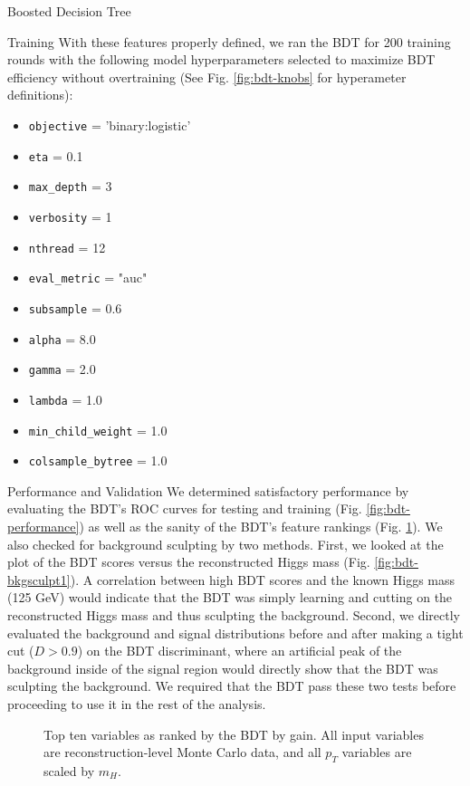 \begin{section}{Boosted Decision Tree}
\begin{subsection}{Training}
With these features properly defined, we ran the BDT for 200 training rounds with the following model hyperparameters selected to maximize BDT efficiency without overtraining (See Fig. \ref{fig:bdt-knobs} for hyperameter definitions):
\begin{itemize}
    \item \verb|objective| = 'binary:logistic'
    \item \verb|eta| = 0.1
    \item \verb|max_depth| = 3
    \item \verb|verbosity| = 1
    \item \verb|nthread| = 12
    \item \verb|eval_metric| = "auc"
    \item \verb|subsample| = 0.6
    \item \verb|alpha| = 8.0
    \item \verb|gamma| = 2.0
    \item \verb|lambda| = 1.0
    \item \verb|min_child_weight| = 1.0
    \item \verb|colsample_bytree| = 1.0
\end{itemize}

\end{subsection}
\begin{subsection}{Performance and Validation}
We determined satisfactory performance by evaluating the BDT's ROC curves for testing and training (Fig. \ref{fig:bdt-performance}) as well as the sanity of the BDT's feature rankings (Fig. \ref{fig:bdt-vars}). We also checked for background sculpting by two methods. First, we looked at the plot of the BDT scores versus the reconstructed Higgs mass (Fig. \ref{fig:bdt-bkgsculpt1}). A correlation between high BDT scores and the known Higgs mass (125 GeV) would indicate that the BDT was simply learning and cutting on the reconstructed Higgs mass and thus sculpting the background. Second, we directly evaluated the background and signal distributions before and after making a tight cut ($D > 0.9$) on the BDT discriminant, where an artificial peak of the background inside of the signal region would directly show that the BDT was sculpting the background. We required that the BDT pass these two tests before proceeding to use it in the rest of the analysis.

\begin{figure}[htb]
\begin{center}

\end{center}
\caption{Top ten variables as ranked by the BDT by gain. All input variables are reconstruction-level Monte Carlo data, and all $p_{T}$ variables are scaled by $m_{H}.$}
\label{fig:bdt-vars}
\end{figure}


\end{subsection}
\end{section}
